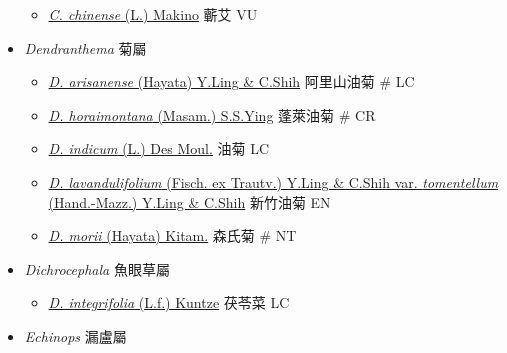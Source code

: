 \begin{itemize}
  \begin{itemize}
        \item[] \href{http://www.theplantlist.org/tpl1.1/search?q=Crossostephium+chinense}{\textit{C. chinense} (L.) Makino}   蘄艾   VU
  \end{itemize}
 \item[] \textit{Dendranthema} 菊屬
                                
  \begin{itemize}
        \item[] \href{http://www.theplantlist.org/tpl1.1/search?q=Dendranthema+arisanense}{\textit{D. arisanense} (Hayata) Y.Ling \& C.Shih}   阿里山油菊  \# LC
        \item[] \href{http://www.theplantlist.org/tpl1.1/search?q=Dendranthema+horaimontana}{\textit{D. horaimontana} (Masam.) S.S.Ying}   蓬萊油菊  \# CR
        \item[] \href{http://www.theplantlist.org/tpl1.1/search?q=Dendranthema+indicum}{\textit{D. indicum} (L.) Des Moul.}   油菊   LC
        \item[] \href{http://www.theplantlist.org/tpl1.1/search?q=Dendranthema+lavandulifolium+var.+tomentellum}{\textit{D. lavandulifolium} (Fisch. ex Trautv.) Y.Ling \& C.Shih var. \textit{tomentellum} (Hand.-Mazz.) Y.Ling \& C.Shih}   新竹油菊   EN
        \item[] \href{http://www.theplantlist.org/tpl1.1/search?q=Dendranthema+morii}{\textit{D. morii} (Hayata) Kitam.}   森氏菊  \# NT
  \end{itemize}
 \item[] \textit{Dichrocephala} 魚眼草屬
                                
  \begin{itemize}
        \item[] \href{http://www.theplantlist.org/tpl1.1/search?q=Dichrocephala+integrifolia}{\textit{D. integrifolia} (L.f.) Kuntze}   茯苓菜   LC
  \end{itemize}
 \item[] \textit{Echinops} 漏盧屬
                                

\end{itemize}

